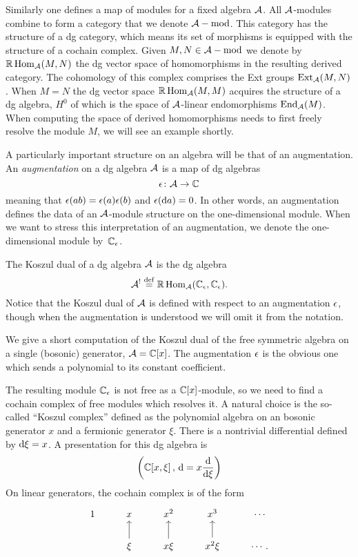 \documentclass[11pt]{amsart}
\def\mod{{\rm mod}}
\newcommand{\RHom}{\mathbb{R}\operatorname{Hom}}
\begin{document}
Similarly one defines a map of modules for a fixed algebra $\mathcal A$. 
All $\mathcal A$-modules combine to form a category that we denote $\cA-\mod$.
This category has the structure of a dg category, which means its set of morphisms is equipped with the structure of a cochain complex. 
Given $M,N \in \cA-\mod$ we denote by $\RHom_\cA(M,N)$ the dg vector space of homomorphisms in the resulting derived category. 
The cohomology of this complex comprises the Ext groups ${\rm Ext}_{\mathcal A}(M,N)$. 
When $M = N$ the dg vector space $\RHom_\cA(M,M)$ acquires the structure of a dg algebra, $H^0$ of which is the space of $\mathcal A$-linear endomorphisms ${\rm End}_{\mathcal A}(M)$.  
When computing the space of derived homomorphisms needs to first freely resolve the module $M$, we will see an example shortly.

A particularly important structure on an algebra will be that of an augmentation. 
An {\em augmentation} on a dg algebra $\mathcal A$ is a map of dg algebras 
\[
\epsilon \colon \mathcal A \to \mathbb C 
\]
meaning that $\epsilon (a b) = \epsilon(a) \epsilon(b)$ and $\epsilon ({\rm d} a) = 0$. 
In other words, an augmentation defines the data of an $\mathcal A$-module structure on the one-dimensional module.
When we want to stress this interpretation of an augmentation, we denote the one-dimensional module by~$\mathbb C_\epsilon$.


The Koszul dual of a dg algebra $\mathcal A$ is the dg algebra
\[
\cA^! \define \RHom_\cA(\CC_\ep,\CC_\ep) .
\] 
Notice that the Koszul dual of $\mathcal A$ is defined with respect to an augmentation $\epsilon$, though when the augmentation is understood we will omit it from the notation. 

\parsec[]

We give a short computation of the Koszul dual of the free symmetric algebra on a single (bosonic) generator, $\mathcal A = \mathbb C[x]$. 
The augmentation $\epsilon$ is the obvious one which sends a polynomial to its constant coefficient. 

The resulting module $\mathbb C_{\epsilon}$ is not free as a $\mathbb C[x]$-module, so we need to find a cochain complex of free modules which resolves it. 
A natural choice is the so-called ``Koszul complex'' defined as the polynomial algebra on an bosonic generator $x$ and a fermionic generator $\xi$. 
There is a nontrivial differential defined by ${\rm d} \xi = x$. 
A presentation for this dg algebra is 
\[
\bigg(\mathbb C[x, \xi] \, , \, {\rm d} = x \frac{{\rm d}}{{\rm d} \xi} \bigg) 
\]
On linear generators, the cochain complex is of the form
\[
\begin{tikzcd} 
1 & x & x^2 & x^3 & \cdots \\
& \xi \ar[u] & x \xi \ar[u] & x^2 \xi \ar[u] & \cdots . 
\end{tikzcd}
\]
\end{document}
